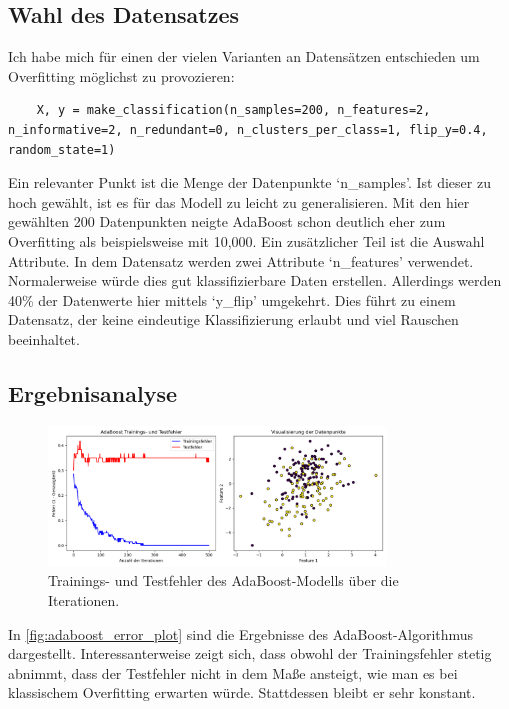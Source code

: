 \subsection{Wahl des Datensatzes} 
Ich habe mich für einen der vielen Varianten an Datensätzen entschieden um Overfitting möglichst zu provozieren:

\begin{lstlisting}
    X, y = make_classification(n_samples=200, n_features=2, n_informative=2, n_redundant=0, n_clusters_per_class=1, flip_y=0.4, random_state=1)
\end{lstlisting}    
Ein relevanter Punkt ist die Menge der Datenpunkte `n\_samples'. Ist dieser zu hoch 
gewählt, ist es für das Modell zu leicht zu generalisieren. Mit den hier gewählten 200 Datenpunkten neigte AdaBoost schon deutlich eher zum Overfitting als beispielsweise mit 10,000.
\newline
Ein zusätzlicher Teil ist die Auswahl Attribute. In dem Datensatz werden zwei Attribute `n\_features' verwendet. Normalerweise würde dies gut klassifizierbare Daten erstellen. Allerdings werden 40\% der Datenwerte hier mittels `y\_flip' umgekehrt. Dies führt zu einem Datensatz, der keine eindeutige Klassifizierung erlaubt und viel Rauschen beeinhaltet.

\subsection{Ergebnisanalyse}
\begin{figure}[h]
    \centering
    \includegraphics[width=0.8\textwidth]{Images/AdaBoost_Error_and_Data.png}
    \caption{Trainings- und Testfehler des AdaBoost-Modells über die Iterationen.}
    \label{fig:adaboost_error_plot}
\end{figure}
In \autoref{fig:adaboost_error_plot} sind die Ergebnisse des AdaBoost-Algorithmus dargestellt. Interessanterweise zeigt sich, dass obwohl der Trainingsfehler stetig abnimmt, dass der Testfehler nicht in dem Maße ansteigt, wie man es bei klassischem Overfitting erwarten würde. Stattdessen bleibt er sehr konstant.


